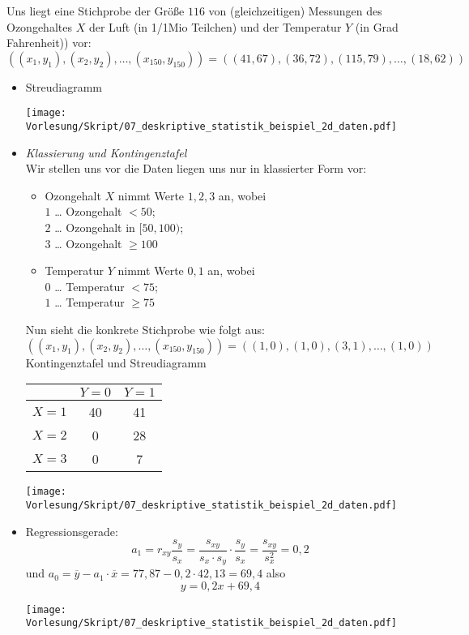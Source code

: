 \documentclass{scrreprt}
\begin{document}
 Uns liegt eine Stichprobe der Größe $116$ von (gleichzeitigen) Messungen des Ozongehaltes $X$ der Luft (in 1/1Mio Teilchen) und der Temperatur $Y$ (in Grad Fahrenheit)) vor:
$$((x_1,y_1),(x_2,y_2), \ldots, (x_{150},y_{150}))=((41,67),(36,72),(115,79),\ldots, (18,62))$$
\begin{itemize}
\item Streudiagramm
\begin{center}
\texttt{[image: Vorlesung/Skript/07\_deskriptive\_statistik\_beispiel\_2d\_daten.pdf]}
\end{center}
\item \emph{Klassierung und Kontingenztafel}\\
Wir stellen uns vor die Daten liegen uns nur in klassierter Form vor:
\begin{itemize}
\item Ozongehalt $X$ nimmt Werte $1,2,3$ an, wobei\\
$1$ … Ozongehalt $<50$;\\
$2$ … Ozongehalt in $[50,100)$;\\
$3$ … Ozongehalt $\geq 100$
\item Temperatur $Y$ nimmt Werte $0,1$ an, wobei\\
$0$ … Temperatur $<75$;\\
$1$ … Temperatur $\geq 75$
\end{itemize}
Nun sieht die konkrete Stichprobe wie folgt aus:
$$((x_1,y_1),(x_2,y_2),\ldots,(x_{150},y_{150}))=((1,0),(1,0),(3,1),\ldots,(1,0))$$
Kontingenztafel und Streudiagramm\\
\begin{tabular}{c | c c}
& $Y=0$ & $Y=1$\\\hline
$X=1$ & 40 & 41\\
$X=2$ & 0 & 28\\
$X=3$ & 0 & 7
\end{tabular}
\begin{center}
\texttt{[image: Vorlesung/Skript/07\_deskriptive\_statistik\_beispiel\_2d\_daten.pdf]}
\end{center}
\item Regressionsgerade:
$$a_1=r_{xy}\frac{s_y}{s_x}=\frac{s_{xy}}{s_x \cdot s_y}\cdot \frac{s_y}{s_x}=\frac{s_{xy}}{s_x^2}=0,2$$
und $a_0=\overline{y}-a_1 \cdot \overline{x}=77,87 - 0,2 \cdot 42,13 = 69,4$ also 
$$y=0,2 x + 69,4$$
\begin{center}
\texttt{[image: Vorlesung/Skript/07\_deskriptive\_statistik\_beispiel\_2d\_daten.pdf]}
\end{center}
\end{itemize}
\end{document}
